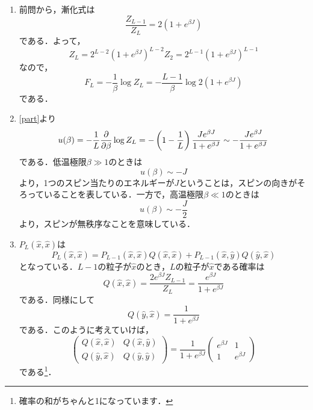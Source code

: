 \documentclass[a4paper,pdflatex,ja=standard]{bxjsarticle}
\begin{document}
\begin{enumerate}
  \item 
  前問から，漸化式は
  \begin{equation}
    \frac{Z_{L-1}}{Z_{L}}
    =
    2(1+e^{\beta J})
  \end{equation}
  である．よって，
  \begin{equation}
    Z_{L}
    =
    2^{L-2}(1+e^{\beta J})^{L-2}Z_{2}
    =
    2^{L-1}(1+e^{\beta J})^{L-1}
    \label{part}
  \end{equation}
  なので，
  \begin{equation}
    F_{L}
    =
    -\frac{1}{\beta}\log Z_{L}
    =
    -\frac{L-1}{\beta}\log 2(1+e^{\beta J})
  \end{equation}
  である．

  \item 
  \eqref{part}より
  \begin{equation}
    u(\beta)
    =
    -\frac{1}{L}\pdv{}{\beta}\log Z_{L}
    =
    -\left( 1-\frac{1}{L} \right)
    \frac{Je^{\beta J}}{1+e^{\beta J}}
    \sim
    -\frac{Je^{\beta J}}{1+e^{\beta J}}
  \end{equation}
  である．低温極限$\beta\gg 1$のときは
  \begin{equation}
    u(\beta)
    \sim
    -J
  \end{equation}
  より，1つのスピン当たりのエネルギーが$J$ということは，スピンの向きがそろっていることを表している．一方で，高温極限$\beta\ll 1$のときは
  \begin{equation}
    u(\beta)
    \sim
    -\frac{J}{2}
  \end{equation}
  より，スピンが無秩序なことを意味している．

  \item 
  $P_{L}(\hat{x},\hat{x})$は
  \begin{equation}    
    P_{L}(\hat{x},\hat{x})
    =    
    P_{L-1}(\hat{x},\hat{x})Q(\hat{x},\hat{x})
    +
    P_{L-1}(\hat{x},\hat{y})Q(\hat{y},\hat{x})
  \end{equation}
  となっている．$L-1$の粒子が$\hat{x}$のとき，$L$の粒子が$\hat{x}$である確率は
  \begin{equation}
    Q(\hat{x},\hat{x})
    =
    \frac{2e^{\beta J}Z_{L-1}}{Z_{L}}
    =
    \frac{e^{\beta J}}{1+e^{\beta J}}
  \end{equation}
  である．同様にして
  \begin{equation}
    Q(\hat{y},\hat{x})
    =    
    \frac{1}{1+e^{\beta J}}
  \end{equation}
  である．このように考えていけば，
  \begin{equation}
    \begin{pmatrix}
      Q(\hat{x},\hat{x}) & Q(\hat{x},\hat{y}) \\
      Q(\hat{y},\hat{x}) & Q(\hat{y},\hat{y})
    \end{pmatrix}
    =
    \frac{1}{1+e^{\beta J}}
    \begin{pmatrix}
      e^{\beta J} & 1 \\
      1 & e^{\beta J}
    \end{pmatrix}
  \end{equation}
  である\footnote{確率の和がちゃんと1になっています．}．


\end{enumerate}
\end{document}
